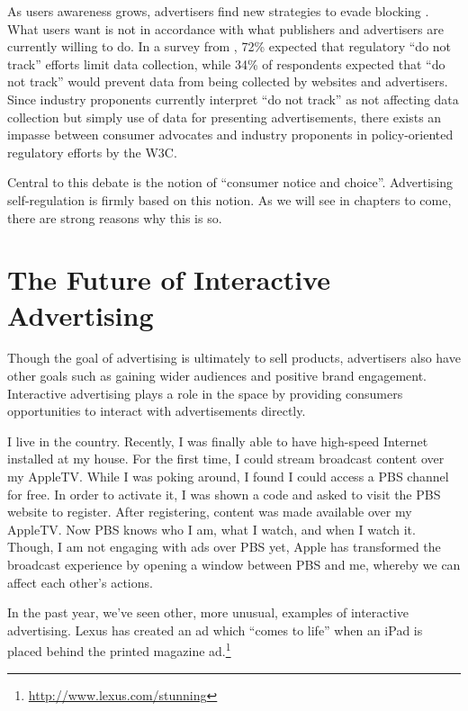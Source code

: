 As users awareness grows, advertisers find new strategies to evade blocking  \citep{Soltani:2009vg, Leon:2012vu, Hoofnagle:2012uc}.  What users want is not in accordance with what publishers and advertisers are currently willing to do. In a survey from  \cite{McDonald:2011uv},  72\% expected that regulatory ``do not track'' efforts limit data collection, while 34\% of respondents expected that ``do not track'' would prevent data from being collected by websites and advertisers. Since industry proponents currently interpret ``do not track'' as not affecting data collection but simply use of data for presenting advertisements, there exists an impasse between consumer advocates and industry proponents in policy-oriented regulatory efforts by the W3C. 

Central to this debate is the notion of ``consumer notice and choice''. Advertising self-regulation is firmly based on this notion. As we will see in chapters to come, there are strong reasons why this is so.

\section{The Future of Interactive Advertising}
\label{thefutureofinteractiveadvertising}

Though the goal of advertising is ultimately to sell products, advertisers also have other goals such as gaining wider audiences and positive brand engagement. Interactive advertising plays a role in the space by providing consumers opportunities to interact with advertisements directly.

I live in the country. Recently, I was finally able to have high-speed Internet installed at my house. For the first time, I could stream broadcast content over my AppleTV. While I was poking around, I found I could access a PBS channel for free. In order to activate it, I was shown a code and asked to visit the PBS website to register. After registering, content was made available over my AppleTV. Now PBS knows who I am, what I watch, and when I watch it. Though, I am not engaging with ads over PBS yet, Apple has transformed the broadcast experience by opening a window between PBS and me, whereby we can affect each other's actions.

In the past year, we've seen other, more unusual, examples of interactive advertising. Lexus has created an ad which ``comes to life'' when an iPad is placed behind the printed magazine  ad.\footnote{\url{http://www.lexus.com/stunning}} 

